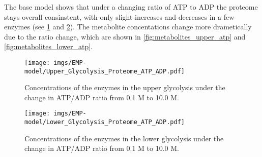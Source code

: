 The base model shows that under a changing ratio of ATP to ADP the proteome stays overall consinstent, with only slight increases and decreases in a few enzymes (see \ref{fig:proteome_upper_atp} and \ref{fig:proteome_lower_atp}). The metabolite concentations change more drametically due to the ratio change, which are shown in \ref{fig:metabolites_upper_atp} and \ref{fig:metabolites_lower_atp}. 
\begin{figure}[H]
    \centering
    \texttt{[image: imgs/EMP-model/Upper\_Glycolysis\_Proteome\_ATP\_ADP.pdf]}
    \caption{Concentrations of the enzymes in the upper glycolysis under the change in ATP/ADP ratio from 0.1 M to 10.0 M.}
    \label{fig:proteome_upper_atp}
\end{figure}

\begin{figure}[H]
    \centering
    \texttt{[image: imgs/EMP-model/Lower\_Glycolysis\_Proteome\_ATP\_ADP.pdf]}
    \caption{Concentrations of the enzymes in the lower glycolysis under the change in ATP/ADP ratio from 0.1 M to 10.0 M.}
    \label{fig:proteome_lower_atp}
\end{figure}

